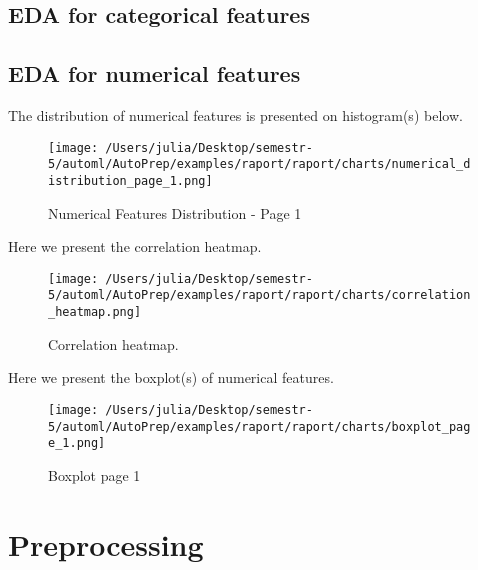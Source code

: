 \documentclass{article}%
\begin{document}
%
\subsection{EDA for categorical features}%
\label{subsec:EDAforcategoricalfeatures}%

%
\subsection{EDA for numerical features}%
\label{subsec:EDAfornumericalfeatures}%

%
The distribution of numerical features is presented on histogram(s) below.%


\begin{figure}[H]%
\centering%
\texttt{[image: /Users/julia/Desktop/semestr-5/automl/AutoPrep/examples/raport/raport/charts/numerical\_distribution\_page\_1.png]}%
\caption{Numerical Features Distribution {-} Page 1}%
\end{figure}

%
Here we present the correlation heatmap.%


\begin{figure}[H]%
\centering%
\texttt{[image: /Users/julia/Desktop/semestr-5/automl/AutoPrep/examples/raport/raport/charts/correlation\_heatmap.png]}%
\caption{Correlation heatmap.}%
\end{figure}

%
Here we present the boxplot(s) of numerical features.%


\begin{figure}[H]%
\centering%
\texttt{[image: /Users/julia/Desktop/semestr-5/automl/AutoPrep/examples/raport/raport/charts/boxplot\_page\_1.png]}%
\caption{Boxplot page 1}%
\end{figure}

%
\section{Preprocessing}%
\label{sec:Preprocessing}%
\end{document}
